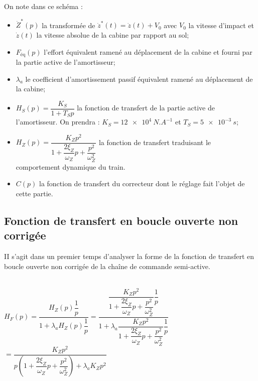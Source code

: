 \begin{multicols}{2}
\begin{multicols}{2}
On note dans ce schéma :
\begin{itemize}
\item $\dot{Z}^*(p)$ la transformée de $\dot{z}^*(t)=\dot{z}(t)+V_0$  avec $V_0$ la vitesse d'impact et $\dot{z}(t)$ la vitesse absolue de la cabine par rapport au sol;%
\item $F_{\text{éq}}(p)$  l'effort équivalent ramené au déplacement de la cabine et fourni par la partie active de l'amortisseur;%
\item $\lambda_a$ le coefficient d'amortissement passif équivalent ramené au déplacement de la cabine;
\item $H_S(p)=\dfrac{K_S}{1+T_Sp}$ la fonction de transfert de la partie active de l'amortisseur. %
On prendra : $K_S = \SI{12e4}{N.A^{-1}}$ et $T_S = \SI{5e-3}{s}$;
\item $H_Z(p)=\dfrac{K_Z p^2}{1+\dfrac{2\xi_Z}{\omega_Z}p+\dfrac{p^2}{\omega_Z^2}}$ la fonction de transfert traduisant le comportement dynamique du train.
\item $C(p)$ la fonction de transfert du correcteur dont le réglage fait l'objet de cette partie.
\end{itemize}
%
%
\fi


\subsection*{Fonction de transfert en boucle ouverte non corrigée}
\begin{obj}
II s'agit dans un premier temps d'analyser la forme de la fonction de transfert en boucle ouverte non corrigée de la chaîne de commande semi-active.
\end{obj}

\ifprof
\begin{corrige}~\\
$H_F(p) = \dfrac{H_Z(p)\dfrac{1}{p}}{1+\lambda_a H_Z(p)\dfrac{1}{p}}= \dfrac{\dfrac{K_Z p^2}{1+\dfrac{2\xi_Z}{\omega_Z}p+\dfrac{p^2}{\omega_Z^2}}\dfrac{1}{p}}{1+\lambda_a \dfrac{K_Z p^2}{1+\dfrac{2\xi_Z}{\omega_Z}p+\dfrac{p^2}{\omega_Z^2}}\dfrac{1}{p}}$
$= \dfrac{K_Z p^2}{p\left( 1+\dfrac{2\xi_Z}{\omega_Z}p+\dfrac{p^2}{\omega_Z^2} \right)+\lambda_a K_Z p^2}$


\end{corrige}
\end{multicols}
\end{multicols}

